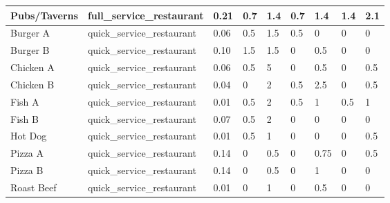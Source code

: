 \begin{table}[]
\begin{tabular}{|l|l|l|l|l|l|l|l|l|}
    Pubs/Taverns             & full\_service\_restaurant       & 0.21                               & 0.7              & 1.4            & 0.7              & 1.4           & 1.4            & 2.1              \\ \hline
    Burger A                 & quick\_service\_restaurant      & 0.06                               & 0.5              & 1.5            & 0.5              & 0             & 0              & 0                \\ \hline
    Burger B                 & quick\_service\_restaurant      & 0.10                               & 1.5              & 1.5            & 0                & 0.5           & 0              & 0                \\ \hline
    Chicken A                & quick\_service\_restaurant      & 0.06                               & 0.5              & 5              & 0                & 0.5           & 0              & 0.5              \\ \hline
    Chicken B                & quick\_service\_restaurant      & 0.04                               & 0                & 2              & 0.5              & 2.5           & 0              & 0.5              \\ \hline
    Fish A                   & quick\_service\_restaurant      & 0.01                               & 0.5              & 2              & 0.5              & 1             & 0.5            & 1                \\ \hline
    Fish B                   & quick\_service\_restaurant      & 0.07                               & 0.5              & 2              & 0                & 0             & 0              & 0                \\ \hline
    Hot Dog                  & quick\_service\_restaurant      & 0.01                               & 0.5              & 1              & 0                & 0             & 0              & 0.5              \\ \hline
    Pizza A                  & quick\_service\_restaurant      & 0.14                               & 0                & 0.5            & 0                & 0.75          & 0              & 0.5              \\ \hline
    Pizza B                  & quick\_service\_restaurant      & 0.14                               & 0                & 0.5            & 0                & 1             & 0              & 0                \\ \hline
    Roast Beef               & quick\_service\_restaurant      & 0.01                               & 0                & 1              & 0                & 0.5           & 0              & 0                \\ \hline

\end{tabular}
\end{table}
